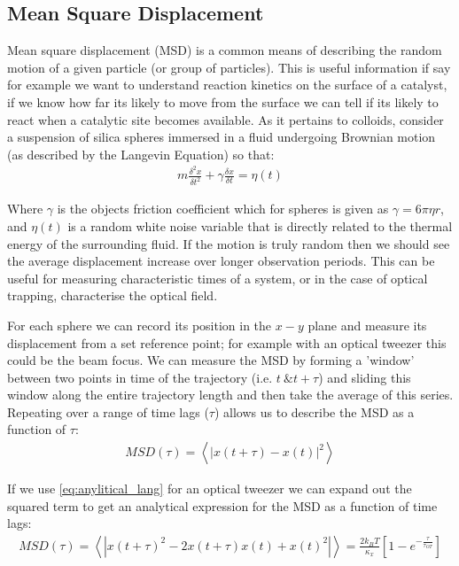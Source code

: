 \subsection{Mean Square Displacement}
Mean square displacement (MSD) is a common means of describing 
the random motion of a given particle (or group of particles). 
This is useful information if say for example we want to understand 
reaction kinetics on the surface of a catalyst, if we know how 
far its likely to move from the surface we can tell if its likely 
to react when a catalytic site becomes available. As it pertains 
to colloids, consider a suspension of silica spheres immersed in 
a fluid undergoing Brownian motion (as described by the Langevin 
Equation) so that:
\begin{align}
	m\frac{\delta^2 x}{\delta t^2}+ 
	\gamma\frac{\delta x}{\delta t} = \eta(t)
\end{align}

Where $\gamma$ is the objects friction coefficient which for spheres 
is given as $\gamma = 6\pi\eta r$, and $\eta(t)$ is a random white 
noise variable that is directly related to the thermal energy of 
the surrounding fluid. If the motion is truly random then we should 
see the average displacement increase over longer observation periods. 
This can be useful for measuring characteristic times of a system, or
in the case of optical trapping, characterise the optical field. 

For each sphere we can record its position in the $x-y$ plane and 
measure its displacement from a set reference point; for example 
with an optical tweezer this could be the beam focus. We can measure 
the MSD by forming a 'window' between two points in time of the 
trajectory (i.e. $t\ \&  t+\tau$) and sliding this window along the 
entire trajectory length and then take the average of this series. Repeating over a range of time lags ($\tau$) allows us to describe 
the MSD as a function of $\tau$:
\begin{align}
	MSD(\tau) = \left<|x(t+\tau) - x(t)|^2\right>
\end{align}

If we use \eqref{eq:anylitical_lang} for an optical tweezer we can 
expand out the squared term to get an analytical expression for the 
MSD as a function of time lags:
\begin{align}
	\label{eq:MSD}
	MSD(\tau) = \left<|x(t+\tau)^2-2x(t+\tau)x(t)+x(t)^2|\right> = \frac{2k_BT}{\kappa_x}\left[1-e^{-\frac{\tau}{\tau_{OT}}}\right]
\end{align}

